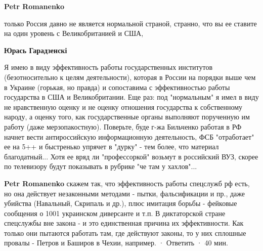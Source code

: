 \begin{itemize}
\begin{itemize}
 
\textbf{Petr Romanenko} 

только Россия давно не является нормальной страной, странно, что вы ее ставите
на один уровень с Великобританией и США,

 
\textbf{Юрась Гарадзенскі} 

Я имею в виду эффективность работы государственных институтов (безотносительно
к целям деятельности), которая в России на порядки выше чем в Украине (горькая,
но правда) и сопоставима с эффективностью работы государства в США и
Великобритании. Еще раз: под "нормальным" я имел в виду не нравственную оценку
и не оценку отношения государства к собственному народу, а оценку того, как
государственные органы выполняют порученную им работу (даже мерзопакостную).
Поверьте, буде г-жа Бильченко работая в РФ начнет вести антироссийскую
информационную деятельность, ФСБ "отработает" ее на 5++ и быстренько упрячет в
"дурку" - тем более, что материал благодатный... Хотя ее вряд ли "профессоркой"
возьмут в российский ВУЗ, скорее по телевизору будут показывать в рубрике "че
там у хахлов"...

 
\textbf{Petr Romanenko} скажем так, что эффективность работы спецслужб рф есть, но она действует незаконными методами - пытки, фальсификации и пр., даже убийства (Навальный, Скрипаль и др.), плюс имитация борьбы - фейковые сообщения о 1001 украинском диверсанте и т.п. В диктаторской стране спецслужбы вне закона - и это единственная причина их эффективности. Как только они пытаются работать там, где действуют законы, то у них сплошные провалы - Петров и Баширов в Чехии, например.
 · Ответить · 40 мин.
 

\end{itemize}
\end{itemize}

